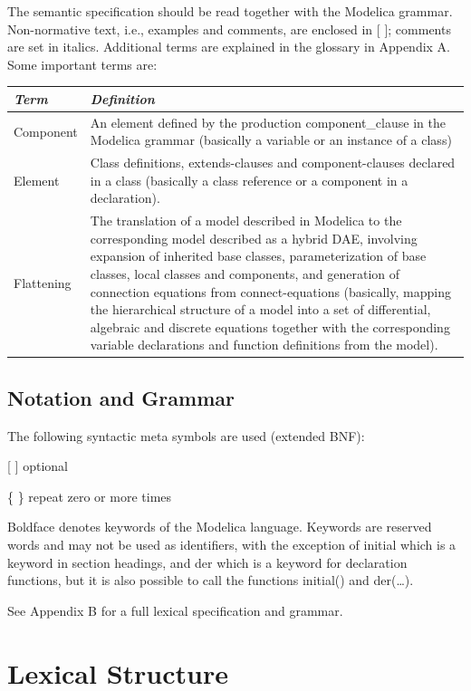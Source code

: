 \documentclass[10pt,a4paper]{report}
\begin{document}
The semantic specification should be read together with the Modelica
grammar. Non-normative text, i.e., examples and comments, are enclosed
in {[} {]}; comments are set in italics. Additional terms are explained
in the glossary in Appendix A. Some important terms are:

\begin{tabular}{|l|p{8.5cm}|}
\hline
\emph{Term} & \emph{Definition} \\
\hline
Component & An element defined by the production
component\_clause in the Modelica grammar (basically a
variable or an instance of a class)\\
\hline
Element  & Class definitions, extends-clauses and
component-clauses declared in a class (basically a class
reference or a component in a declaration). \\
\hline
Flattening & The translation of a model described in Modelica to the
corresponding model described as a hybrid DAE, involving expansion of
inherited base classes, parameterization of base classes, local classes
and components, and generation of connection equations from
connect-equations (basically, mapping the hierarchical structure of a
model into a set of differential, algebraic and discrete equations
together with the corresponding variable declarations and function
definitions from the model).\\
\hline
\end{tabular}

\section{Notation and Grammar}

The following syntactic meta symbols are used (extended BNF):

{[} {]} optional

\{ \} repeat zero or more times

Boldface denotes keywords of the Modelica language. Keywords are
reserved words and may not be used as identifiers, with the exception of
initial which is a keyword in section headings, and der which is a
keyword for declaration functions, but it is also possible to call the
functions initial() and der(\ldots{}).

See Appendix B for a full lexical specification and grammar.

\chapter{Lexical Structure}
\end{document}
